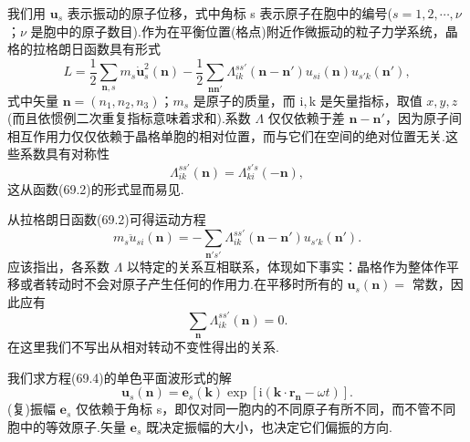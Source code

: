 我们用 $\boldsymbol{u}_s$ 表示振动的原子位移，式中角标 s 表示原子在胞中的编号($s=1,2,\cdots,\nu$；$\nu$ 是胞中的原子数目).作为在平衡位置(格点)附近作微振动的粒子力学系统，晶格的拉格朗日函数具有形式
\begin{equation}
  L=\frac{1}{2}\sum_{\boldsymbol{n},s}m_s\dot{\boldsymbol{u}}_s^2(\boldsymbol{n})
  -\frac{1}{2}\sum_{\boldsymbol{n}\boldsymbol{n}'}\Lambda_{ik}^{ss'}\left(\boldsymbol{n}-\boldsymbol{n}'\right)
  u_{si}(\boldsymbol{n})u_{s'k}(\boldsymbol{n}'),
\end{equation}
式中矢量 $\boldsymbol{n}=(n_1,n_2,n_3)$；$m_s$ 是原子的质量，而 i,\,k 是矢量指标，取值 $x,y,z$(而且依惯例二次重复指标意味着求和).系数 $\Lambda$ 仅仅依赖于差 $\boldsymbol{n}-\boldsymbol{n}'$，因为原子间相互作用力仅仅依赖于晶格单胞的相对位置，而与它们在空间的绝对位置无关.这些系数具有对称性
\begin{equation}
  \Lambda_{ik}^{ss'}(\boldsymbol{n})=\Lambda_{ki}^{s's}(-\boldsymbol{n}),
\end{equation}
这从函数(69.2)的形式显而易见.

从拉格朗日函数(69.2)可得运动方程
\begin{equation}
  m_s\ddot{u}_{si}(\boldsymbol{n})
  =-\sum_{\boldsymbol{n}'s'}\Lambda_{ik}^{ss'}\left(\boldsymbol{n}-\boldsymbol{n}'\right)u_{s'k}\left(\boldsymbol{n}'\right).
\end{equation}
应该指出，各系数 $\Lambda$ 以特定的关系互相联系，体现如下事实：晶格作为整体作平移或者转动时不会对原子产生任何的作用力.在平移时所有的 $\boldsymbol{u}_s(\boldsymbol{n})=$ 常数，因此应有
\begin{equation}
  \sum_{\boldsymbol{n}}\Lambda_{ik}^{ss'}(\boldsymbol{n})=0.
\end{equation}
在这里我们不写出从相对转动不变性得出的关系.

我们求方程(69.4)的单色平面波形式的解
\begin{equation}
  \boldsymbol{u}_s(\boldsymbol{n})
  =\boldsymbol{e}_s(\boldsymbol{k})\exp\left[\mathrm{i}\left(\boldsymbol{k}\cdot\boldsymbol{r}_{\boldsymbol{n}}-\omega t\right)\right].
\end{equation}
(复)振幅 $\boldsymbol{e}_s$ 仅依赖于角标 s，即仅对同一胞内的不同原子有所不同，而不管不同胞中的等效原子.矢量 $\boldsymbol{e}_s$ 既决定振幅的大小，也决定它们偏振的方向.

